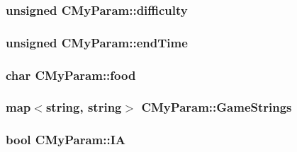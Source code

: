 \subsubsection[{\texorpdfstring{difficulty}{difficulty}}]{\setlength{\rightskip}{0pt plus 5cm}unsigned C\+My\+Param\+::difficulty}\hypertarget{struct_c_my_param_a3848248ca913f8abff022ca7e9de4219}{}\label{struct_c_my_param_a3848248ca913f8abff022ca7e9de4219}
\subsubsection[{\texorpdfstring{end\+Time}{endTime}}]{\setlength{\rightskip}{0pt plus 5cm}unsigned C\+My\+Param\+::end\+Time}\hypertarget{struct_c_my_param_a3afeb99110158c6cf4d68ad5246f0043}{}\label{struct_c_my_param_a3afeb99110158c6cf4d68ad5246f0043}
\subsubsection[{\texorpdfstring{food}{food}}]{\setlength{\rightskip}{0pt plus 5cm}char C\+My\+Param\+::food}\hypertarget{struct_c_my_param_a4df5fa144f6e427e038fac7fbd28e6d7}{}\label{struct_c_my_param_a4df5fa144f6e427e038fac7fbd28e6d7}
\subsubsection[{\texorpdfstring{Game\+Strings}{GameStrings}}]{\setlength{\rightskip}{0pt plus 5cm}map$<$string, string$>$ C\+My\+Param\+::\+Game\+Strings}\hypertarget{struct_c_my_param_a14680b6b2da1e5d7d4c580d290bd1d4b}{}\label{struct_c_my_param_a14680b6b2da1e5d7d4c580d290bd1d4b}
\subsubsection[{\texorpdfstring{IA}{IA}}]{\setlength{\rightskip}{0pt plus 5cm}bool C\+My\+Param\+::\+IA}\hypertarget{struct_c_my_param_a56420b1ed8e44615fd5ae20c86ba7a6c}{}\label{struct_c_my_param_a56420b1ed8e44615fd5ae20c86ba7a6c}
